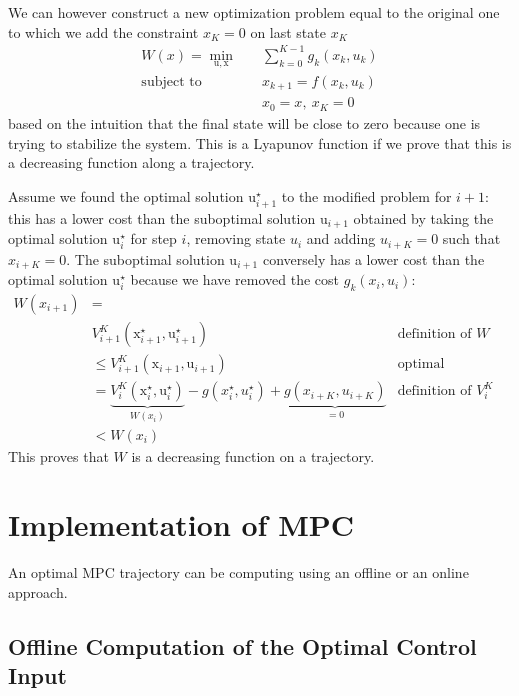 \documentclass[11pt]{report}
\newcommand{\bs}[1]{\boldsymbol{#1}}
\newcommand{\bsu}{\bs{\mathrm{u}}}
\newcommand{\bsx}{\bs{\mathrm{x}}}
\begin{document}
We can however construct a new optimization problem equal to the original one to which we add the constraint $x_K=0$ on last state $x_K$
\begin{equation}
  \label{eq:lyapunov-tracking-MPC}
  \begin{aligned}
    W(x) = \min_{\bsu,\bsx} &\quad \sum_{k=0}^{K-1} g_k(x_k,u_k) \\
    \text{subject to } &\quad x_{k+1} = f(x_k,u_k) \\
                                            &\quad  x_0 = x,\ x_K = 0
  \end{aligned}
\end{equation}
based on the intuition that the final state will be close to zero because one is trying to stabilize the system. This is a Lyapunov function if we prove that this is a decreasing function along a trajectory.

Assume we found the optimal solution $\bsu_{i+1}^\star$ to the modified problem for $i+1$: this has a lower cost than the suboptimal solution $\bsu_{i+1}$ obtained by taking the optimal solution $\bsu_i^\star$ for step $i$, removing state $u_i$ and adding $u_{i+K} = 0$ such that $x_{i+K} = 0$. The suboptimal solution $\bsu_{i+1}$ conversely has a lower cost than the optimal solution $\bsu_i^\star$ because we have removed the cost $g_k(x_i,u_i)$:
\begin{align*}
  W(x_{i+1}) &= \\
  & V_{i+1}^K(\bsx_{i+1}^\star, \bsu_{i+1}^\star) & \text{definition of $W$} \\
             & \leq V_{i+1}^K(\bsx_{i+1}, \bsu_{i+1}) & \text{optimal trajectory} \\
             & = \underbrace{V_i^K(\bsx_i^\star, \bsu_i^\star)}_{W(x_i)} - g(x_i^\star,u_i^\star) + \underbrace{g(x_{i+K},u_{i+K})}_{=0} & \text{definition of $V_i^K$} \\
  & < W(x_i)
\end{align*}
This proves that $W$ is a decreasing function on a trajectory.


\section{Implementation of MPC}
\label{sec:implementation-MPC}

An optimal MPC trajectory can be computing using an offline or an online approach.

\subsection{Offline Computation of the Optimal Control Input}
\label{sec:offline-computation-MPC}
\end{document}
